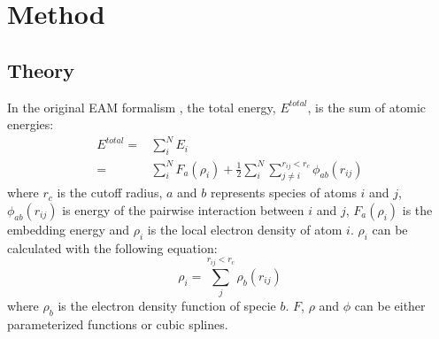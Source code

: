 \documentclass[prb,reprint]{revtex4-2}
\begin{document}
% 
%
\section{Method}
\label{sec:method}


\subsection{Theory}
\label{sec:theory}

In the original EAM formalism \cite{EAM0}, the total energy, $E^{total}$, is the 
sum of atomic energies:
\begin{align}
E^{total} = & \sum_{i}^{N}{E_{i}} \nonumber \\
\label{eq:eam_total_energy}
= & \sum_{i}^{N}{F_{a}(\rho_i)} + 
    \frac{1}{2}\sum_{i}^{N}{\sum_{j \neq i}^{r_{ij} < r_c}{
    \phi_{ab}(r_{ij})
}}
\end{align}
where $r_c$ is the cutoff radius, $a$ and $b$ represents species of atoms $i$ 
and $j$, $\phi_{ab}(r_{ij})$ is energy of the pairwise interaction between $i$ 
and $j$, $F_{a}(\rho_{i})$ is the embedding energy and $\rho_{i}$ is the local 
electron density of atom $i$. $\rho_{i}$ can be calculated with the following 
equation:
\begin{equation}
\label{eq:rho_eam}
\rho_{i} = \sum_{j}^{r_{ij} < r_{c}}{
    \rho_{b}(r_{ij})
}
\end{equation}
where $\rho_{b}$ is the electron density function of specie $b$. 
$F$, $\rho$ and $\phi$ can be either parameterized functions or cubic splines.
\end{document}
